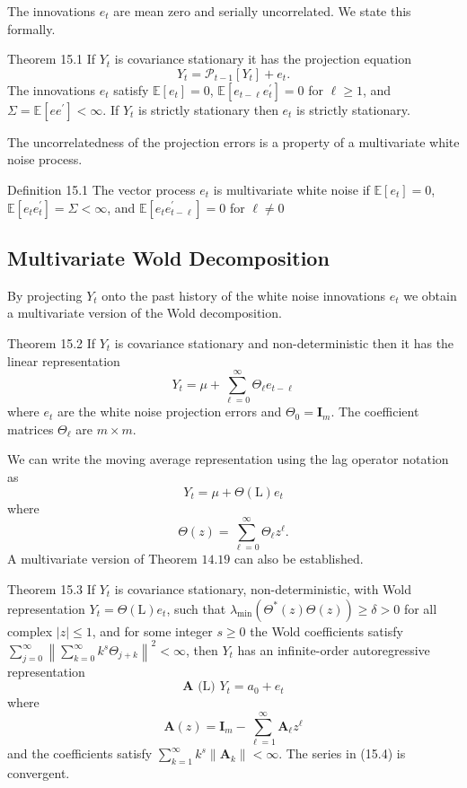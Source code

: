 \documentclass[10pt]{article}
\begin{document}
The innovations $e_{t}$ are mean zero and serially uncorrelated. We state this formally.

Theorem 15.1 If $Y_{t}$ is covariance stationary it has the projection equation
$$
Y_{t}=\mathscr{P}_{t-1}\left[Y_{t}\right]+e_{t} .
$$
The innovations $e_{t}$ satisfy $\mathbb{E}\left[e_{t}\right]=0$, $\mathbb{E}\left[e_{t-\ell} e_{t}^{\prime}\right]=0$ for $\ell \geq 1$, and $\Sigma=\mathbb{E}\left[e e^{\prime}\right]<\infty$. If $Y_{t}$ is strictly stationary then $e_{t}$ is strictly stationary.

The uncorrelatedness of the projection errors is a property of a multivariate white noise process.

Definition 15.1 The vector process $e_{t}$ is multivariate white noise if $\mathbb{E}\left[e_{t}\right]=0$, $\mathbb{E}\left[e_{t} e_{t}^{\prime}\right]=\Sigma<\infty$, and $\mathbb{E}\left[e_{t} e_{t-\ell}^{\prime}\right]=0$ for $\ell \neq 0$

\subsection{Multivariate Wold Decomposition}
By projecting $Y_{t}$ onto the past history of the white noise innovations $e_{t}$ we obtain a multivariate version of the Wold decomposition.

Theorem 15.2 If $Y_{t}$ is covariance stationary and non-deterministic then it has the linear representation
$$
Y_{t}=\mu+\sum_{\ell=0}^{\infty} \Theta_{\ell} e_{t-\ell}
$$
where $e_{t}$ are the white noise projection errors and $\Theta_{0}=\boldsymbol{I}_{m}$. The coefficient matrices $\Theta_{\ell}$ are $m \times m$.

We can write the moving average representation using the lag operator notation as
$$
Y_{t}=\mu+\Theta(\mathrm{L}) e_{t}
$$
where
$$
\Theta(z)=\sum_{\ell=0}^{\infty} \Theta_{\ell} z^{\ell} .
$$
A multivariate version of Theorem $14.19$ can also be established.

Theorem 15.3 If $Y_{t}$ is covariance stationary, non-deterministic, with Wold representation $Y_{t}=\Theta(\mathrm{L}) e_{t}$, such that $\lambda_{\min }\left(\Theta^{*}(z) \Theta(z)\right) \geq \delta>0$ for all complex $|z| \leq 1$, and for some integer $s \geq 0$ the Wold coefficients satisfy $\sum_{j=0}^{\infty}\left\|\sum_{k=0}^{\infty} k^{s} \Theta_{j+k}\right\|^{2}<\infty$, then $Y_{t}$ has an infinite-order autoregressive representation
$$
\boldsymbol{A} \text { (L) } Y_{t}=a_{0}+e_{t}
$$
where
$$
\boldsymbol{A}(z)=\boldsymbol{I}_{m}-\sum_{\ell=1}^{\infty} \boldsymbol{A}_{\ell} z^{\ell}
$$
and the coefficients satisfy $\sum_{k=1}^{\infty} k^{s}\left\|\boldsymbol{A}_{k}\right\|<\infty$. The series in (15.4) is convergent.
\end{document}
